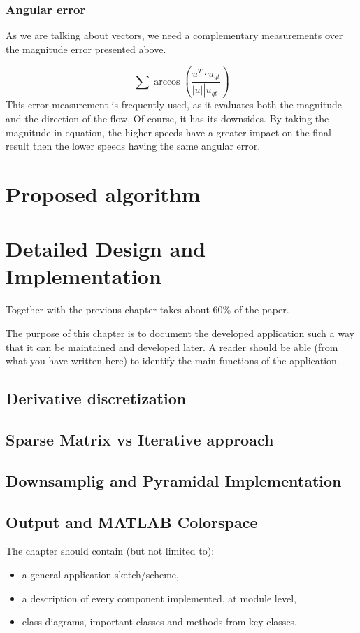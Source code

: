 \documentclass[12pt,a4paper,twoside]{report}
\begin{document}
\subsection{Angular error}
As we are talking about vectors, we need a complementary measurements over the magnitude error presented above.


\begin{equation}
\sum  \arccos \left( \frac{u^T \cdot u_{gt}}{|u||u_{gt}|}\right)
\end{equation}
 This error measurement is frequently used, as it evaluates both the magnitude and the direction of the flow. Of course, it has its downsides. By taking the magnitude in equation, the higher speeds have a greater impact on the final result then the lower speeds having the same angular error. 

\chapter{Proposed algorithm}

\chapter{Detailed Design and Implementation}

Together with the previous chapter takes about 60\% of the paper.

The purpose of this chapter is to document the developed application such a way that it can be maintained and developed later. A reader should be able (from what you have written here) to identify the main functions of the application.
\section{Derivative discretization}
\section{Sparse Matrix vs Iterative approach}
\section{Downsamplig and Pyramidal Implementation}
\section{Output and MATLAB Colorspace}
The chapter should contain (but not limited to):
\begin{itemize}
 \item a general application sketch/scheme,
\item a description of every component implemented, at module level,
\item class diagrams, important classes and methods from key classes.

\end{itemize}
\end{document}
